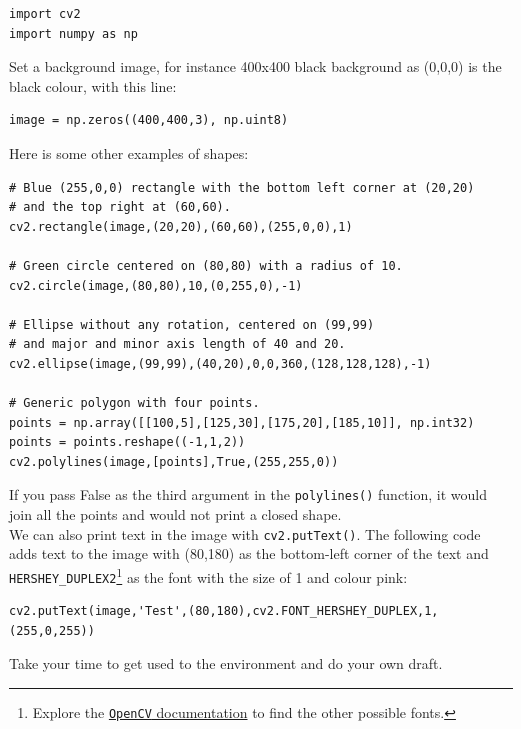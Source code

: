 \documentclass{labo}
\newcommand{\opencv}{\texttt{OpenCV} }
\begin{document}
\begin{verbatim}
import cv2
import numpy as np
\end{verbatim}

Set a background image, for instance 400x400 black background as (0,0,0) is the black colour, with this line:

\begin{verbatim}
image = np.zeros((400,400,3), np.uint8)
\end{verbatim}

Here is some other examples of shapes:

\begin{verbatim}
# Blue (255,0,0) rectangle with the bottom left corner at (20,20)
# and the top right at (60,60).
cv2.rectangle(image,(20,20),(60,60),(255,0,0),1)

# Green circle centered on (80,80) with a radius of 10.
cv2.circle(image,(80,80),10,(0,255,0),-1)

# Ellipse without any rotation, centered on (99,99)
# and major and minor axis length of 40 and 20.
cv2.ellipse(image,(99,99),(40,20),0,0,360,(128,128,128),-1)

# Generic polygon with four points.
points = np.array([[100,5],[125,30],[175,20],[185,10]], np.int32)
points = points.reshape((-1,1,2))
cv2.polylines(image,[points],True,(255,255,0))
\end{verbatim}

If you pass False as the third argument in the \texttt{polylines()} function, it would join all the points and would not print a closed shape.\\

We can also print text in the image with \texttt{cv2.putText()}. The following code adds text to the image with (80,180) as the bottom-left corner of the text and \texttt{HERSHEY\_DUPLEX2}\footnote{Explore the \href{https://docs.opencv.org/4.x/}{\opencv documentation} to find the other possible fonts.} as the font with the size of 1 and colour pink:

\begin{verbatim}
cv2.putText(image,'Test',(80,180),cv2.FONT_HERSHEY_DUPLEX,1,(255,0,255))
\end{verbatim}

\begin{leftbar}
Take your time to get used to the environment and do your own draft.
\end{leftbar}
\end{document}
